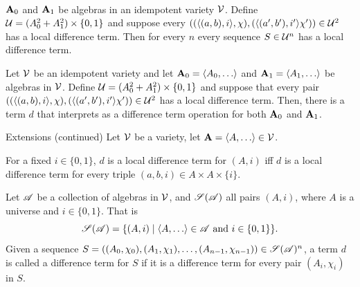 \documentclass[notes=hide,12pt,xcolor=dvipsnames%
   ]{beamer}
\renewcommand{\cite}[1]{\relax}
\newcommand{\defin}[1]{\alert{#1}}
\theoremstyle{definition}
\begin{document}
\begin{frame}[label=extensions]{~}


  \begin{theorem} %
  \label{thm:mixed-local-diff-terms}
  $\mathbf{A}_0$ and   $\mathbf{A}_1$ be algebras in an idempotent variety $\mathcal{V}$.
  Define $\mathcal{U}  = (A_0^2 + A_1^2)\times \{0,1\}$
  and suppose every 
  $((\langle(a, b), i\rangle, \chi), (\langle(a', b'), i'\rangle\chi')) \in \mathcal{U}^2$
  has a local difference term.
  Then for every $n$ every sequence $S \in \mathcal{U}^n$
  has a local difference term.
  \end{theorem}

  \pause

  \begin{corollary}
  \label{cor:mix-loc-diff-term}
  Let $\mathcal{V}$ be an idempotent variety and let
  $\bA_0 = \<A_0, \dots\>$ and   $\bA_1 = \<A_1, \dots\>$ be algebras in $\mathcal{V}$. Define
  $\mathcal{U}  = (A_0^2 + A_1^2)\times \{0,1\}$
  and suppose that every pair
  $((\langle(a, b), i\rangle, \chi), (\langle(a', b'), i'\rangle\chi')) \in \mathcal{U}^2$
  has a local difference term. Then, there is a term $d$ that interprets as a
  difference term operation for both $\mathbf{A}_0$ and $\mathbf{A}_1$.
  \end{corollary}
\end{frame}

\begin{frame}[label=extensions]{Extensions (continued)}
  Let $\mathcal{V}$ be a variety, let $\bA = \<A, \dots\> \in \sV$. 

  For a fixed $i\in \{0,1\}$, $d$ is a \defin{local difference term for $(A, i)$} iff
  $d$ is a local difference term for every triple
  $(a,b,i) \in A \times A \times \{i\}$.

  \pause
  Let $\mathscr{A}$ be a collection of algebras in $\mathcal{V}$, and
  $\mathscr{S}(\mathscr{A})$ all pairs $(A, i)$,
  where $A$ is a universe and $i\in \{0,1\}$. That is
  \[
  \scS(\scA) = \{(A, i) \mid \<A, \dots\> \in \scA \text{ and } i \in \{0,1\}\}.
  \]
  \pause
  Given a sequence
  $S = ((A_0, \chi_0), (A_1, \chi_1), \dots,
  (A_{n-1},\chi_{n-1})) \in \mathscr{S}(\mathscr{A})^n$,
  a term $d$ is called a \defin{\glocal difference term for $S$}
  if it is a \glocal difference term for every pair $(A_i, \chi_i)$ in $S$.
  
\end{frame}
\end{document}
